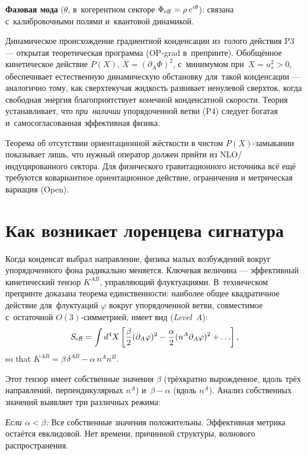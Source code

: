 \documentclass[11pt,a4paper]{article}
\begin{document}
\textbf{Фазовая мода} ($\theta$, в~когерентном секторе $\Phi_{\rm eff} = \rho\,e^{i\theta}$): связана с~калибровочными полями и~квантовой динамикой.

Динамическое происхождение градиентной конденсации из~голого действия P3 --- открытая теоретическая программа (OP-grad в~препринте). Обобщённое кинетическое действие $P(X)$, $X = (\partial_A\Phi)^2$, с~минимумом при~$X = u_*^2 > 0$, обеспечивает естественную динамическую обстановку для~такой конденсации --- аналогично тому, как сверхтекучая жидкость развивает ненулевой сверхток, когда свободная энергия благоприятствует конечной конденсатной скорости. Теория устанавливает, что \emph{при~наличии} упорядоченной ветви (P4) следует богатая и~самосогласованная эффективная физика.

Теорема об отсутствии ориентационной жёсткости в чистом $P(X)$-замыкании показывает лишь, что нужный оператор должен прийти из NLO/индуцированного сектора. Для физического гравитационного источника всё ещё требуются ковариантное ориентационное действие, ограничения и метрическая вариация (Open).


\section{Как возникает лоренцева сигнатура}
\label{sec:pop_lorentzian}

Когда конденсат выбрал направление, физика малых возбуждений вокруг упорядоченного фона радикально меняется. Ключевая величина --- эффективный кинетический тензор $K^{AB}$, управляющий флуктуациями. В~техническом препринте доказана теорема единственности: наиболее общее квадратичное действие для~флуктуаций $\varphi$ вокруг упорядоченной ветви, совместимое с~остаточной $O(3)$-симметрией, имеет вид (\emph{Level~A}):
\begin{equation}
  S_{\rm eff} = \int d^4X \left[
  \frac{\beta}{2}(\partial_A\varphi)^2
  - \frac{\alpha}{2}(n^A\partial_A\varphi)^2
  + \ldots\right],
  \label{eq:pop_eft}
\end{equation}
so that
$K^{AB} = \beta\,\delta^{AB} - \alpha\,n^A n^B$.

Этот тензор имеет собственные значения $\beta$ (трёхкратно вырожденное, вдоль трёх направлений, перпендикулярных $n^A$) и~$\beta - \alpha$ (вдоль $n^A$). Анализ собственных значений выявляет три различных режима:

\emph{Если $\alpha < \beta$:} Все собственные значения положительны. Эффективная метрика остаётся евклидовой. Нет времени, причинной структуры, волнового распространения.
\end{document}

